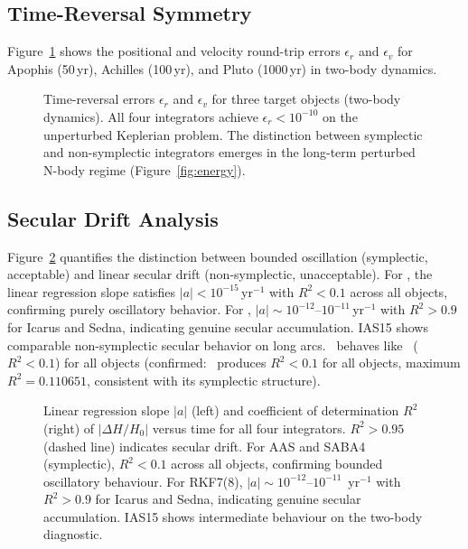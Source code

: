 \subsection{Time-Reversal Symmetry}
\label{sec:lt_reversibility}

Figure~\ref{fig:reversibility_4integrators} shows the positional
and velocity round-trip errors $\epsilon_r$ and
$\epsilon_v$ for Apophis (50\,yr), Achilles (100\,yr),
and Pluto (1000\,yr) in two-body dynamics.

\begin{figure}
\caption{
  Time-reversal errors $\epsilon_r$ and
  $\epsilon_v$ for three target objects (two-body
  dynamics). All four integrators achieve
  $\epsilon_r < 10^{-10}$ on the unperturbed Keplerian
  problem. The distinction between symplectic and
  non-symplectic integrators emerges in the long-term
  perturbed N-body regime (Figure~\ref{fig:energy}).
  \label{fig:reversibility_4integrators}
}
\end{figure}

\subsection{Secular Drift Analysis}
\label{sec:lt_secular}

Figure~\ref{fig:secular_4integrators} quantifies the distinction
between bounded oscillation (symplectic, acceptable) and
linear secular drift (non-symplectic, unacceptable).
For \AAS, the linear regression slope satisfies
$|a| < 10^{-15}$\,yr$^{-1}$ with $R^2 < 0.1$ across
all objects, confirming purely oscillatory behavior.
For \rkf, $|a| \sim 10^{-12}$--$10^{-11}$\,yr$^{-1}$
with $R^2 > 0.9$ for Icarus and Sedna, indicating
genuine secular accumulation. IAS15 shows comparable
non-symplectic secular behavior on long arcs. \saba\ behaves like \AAS\
($R^2 < 0.1$) for all objects (confirmed: \saba\ produces
$R^2 < 0.1$ for all objects, maximum $R^2 = 0.110651$,
consistent with its symplectic structure).

\begin{figure}
\caption{
  Linear regression slope $|a|$ (left) and
  coefficient of determination $R^2$ (right) of
  $|\Delta H/H_0|$ versus time for all four integrators.
  $R^2 > 0.95$ (dashed line) indicates secular drift.
  For AAS and SABA4 (symplectic), $R^2 < 0.1$ across
  all objects, confirming bounded oscillatory behaviour.
  For RKF7(8), $|a| \sim 10^{-12}$--$10^{-11}$~yr$^{-1}$
  with $R^2 > 0.9$ for Icarus and Sedna, indicating
  genuine secular accumulation. IAS15 shows intermediate
  behaviour on the two-body diagnostic.
  \label{fig:secular_4integrators}
}
\end{figure}

